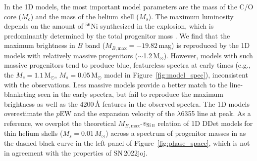 \documentclass[twocolumn]{aastex631}
\newcommand{\sn}{SN\,2022joj}
\begin{document}
\begin{CJK*}{UTF8}{gbsn}
In the 1D models, the most important model parameters are the mass of the C/O core ($M_c$) and the mass of the helium shell ($M_s$). The maximum luminosity depends on the amount of $^{56}$Ni synthesized in the explosion, which is predominantly determined by the total progenitor mass \citep[$M_c+M_s$;][]{polin_observational_2019}. We find that the maximum brightness in $B$ band ($M_{B,\mathrm{max}}=-19.82$\,mag) is reproduced by the 1D models with relatively massive progenitors ($\sim$1.2\,$\mathrm{M_\odot}$). However, models with such massive progenitors tend to produce blue, featureless spectra at early times (e.g., the $M_c=1.1\,\mathrm{M_\odot}$, $M_s=0.05\,\mathrm{M_\odot}$ model in Figure~\ref{fig:model_spec}), inconsistent with the observations. Less massive models provide a better match to the line-blanketing seen in the early spectra, but fail to reproduce the maximum brightness as well as the 4200\,\r{A} features in the observed spectra. The 1D models overestimate the $p$EW and the expansion velocity of the  $\lambda$6355 line at peak. As a reference, we overplot the theoretical $M_{B,\mathrm{max}}$-$v_\mathrm{Si\,\textsc{ii}}$ relation of 1D DDet models for thin helium shells ($M_s = 0.01\,M_\odot$) across a spectrum of progenitor masses in \citet{polin_observational_2019} as the dashed black curve in the left panel of Figure~\ref{fig:phase_space}, which is not in agreement with the properties of \sn.


\end{CJK*}
\end{document}
